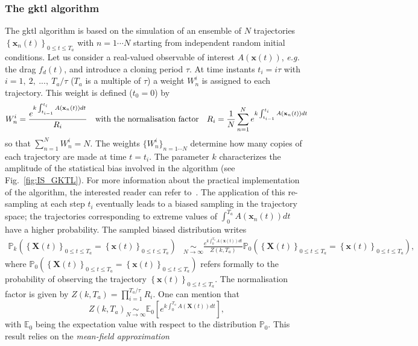 \documentclass[pre,aps,floatfix,10pt,superscriptaddress, notitlepage,preprint]{revtex4-1}
\begin{document}
\subsubsection{The \ac{gktl} algorithm}
\label{sec:gktl_description}
The \ac{gktl} algorithm is based on the simulation of an ensemble of $N$ trajectories $\left\{\mathbf{x}_{n}(t)\right\}_{0\leq t \leq T_a}$ with $ n =1 \cdots N$ starting from independent random initial conditions.
%
Let us consider a real-valued observable of interest $A(\mathbf{x}(t))$, {\emph{e.g.} the drag $f_d(t)$}, and introduce a cloning period $\tau$.
%
At time instants $t_{i}=i\tau$ with $i=1,~2,~...,~T_{a}/\tau$ ($T_{a}$ is a multiple of $\tau$) a weight $W_{n}^{i}$ is assigned to each trajectory. This weight is defined ($t_0=0$) by
%
\begin{equation}
W_{n}^{i}=\frac{e^{k\intop_{t_{i-1}}^{t_{i}}A(\mathbf{x}_{n}(t))dt}}{R_{i}}\quad \mbox{with the normalisation factor} \quad R_{i}=\frac{1}{N}\sum_{n=1}^{N}e^{k\int_{t_{i-1}}^{t_{i}}A(\mathbf{x}_{n}(t))dt}
\label{eq:Weight}
\end{equation}
so that $\sum_{n=1}^N W_n^i = N$.
%
%
{The weights $\{W_{n}^{i}\}_{n=1\cdots N}$ determine how many copies of each trajectory are made at time $t=t_i$. The parameter $k$ characterizes the amplitude of the statistical bias involved in the algorithm (see Fig.~\ref{fig:IS_GKTL}). For more information about the practical implementation of the algorithm, the interested reader can refer to~\cite{brewer2018efficient, lestang:tel-01974316}}.
The application of this re-sampling at each step $t_i$ eventually leads to a biased sampling in the trajectory space; the trajectories corresponding to extreme values of $\int_{0}^{T_a}A(\mathbf{x}_{n}(t))dt$ have a higher probability.
%
The sampled biased distribution writes
%
\begin{align}
\mathbb{P}_{k}\left(\left\{ \mathbf{X}(t)\right\} _{0\leq t\leq T_{a}}=\left\{ \mathbf{x}(t)\right\} _{0\leq t\leq T_{a}}\right) &\underset{N\rightarrow\infty}{\sim} \frac{e^{k\int_{0}^{T_{a}}A(\mathbf{x}(t))dt}}{Z(k,T_a)}\mathbb{\mathbb{P}}_{0}\left(\left\{ \mathbf{X}(t)\right\} _{0\leq t\leq T_{a}}=\left\{ \mathbf{x}(t)\right\} _{0\leq t\leq T_{a}}\right),
\label{eq:Biased_Path_Approximation}
\end{align}
where
$\mathbb{P}_{0}\left(\left\{ \mathbf{X}(t)\right\} _{0\leq t\leq T_{a}} = \left\{ \mathbf{x}(t)\right\} _{0\leq t\leq T_{a}}\right)$ 
refers formally to the probability of observing the trajectory 
$\left\{ \mathbf{x}(t)\right\} _{0\leq t\leq T_{a}}$.
The normalisation factor is given by $Z(k,T_a)=\prod_{i=1}^{T_a/\tau}R_i$.
%
One can mention that
\begin{equation}
  \label{eq:mean_field}
  Z(k,T_a) \underset{N\to \infty}{\sim} \mathbb{E}_0\left[e^{k\int_{0}^{T_{a}}A(\mathbf{X}(t))dt}\right],
\end{equation}
with $\mathbb{E}_{0}$ being the expectation value with respect to the
distribution $\mathbb{P}_{0}$.
This result relies on the \textit{mean-field approximation}
\end{document}
